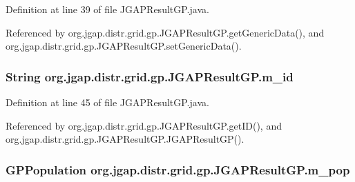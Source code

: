 Definition at line 39 of file J\-G\-A\-P\-Result\-G\-P.\-java.



Referenced by org.\-jgap.\-distr.\-grid.\-gp.\-J\-G\-A\-P\-Result\-G\-P.\-get\-Generic\-Data(), and org.\-jgap.\-distr.\-grid.\-gp.\-J\-G\-A\-P\-Result\-G\-P.\-set\-Generic\-Data().

\hypertarget{classorg_1_1jgap_1_1distr_1_1grid_1_1gp_1_1_j_g_a_p_result_g_p_ac524027057f8527767293b850f8b6e8d}{
\subsubsection[{m\-\_\-id}]{\setlength{\rightskip}{0pt plus 5cm}String org.\-jgap.\-distr.\-grid.\-gp.\-J\-G\-A\-P\-Result\-G\-P.\-m\-\_\-id\hspace{0.3cm}{\ttfamily [private]}}}\label{classorg_1_1jgap_1_1distr_1_1grid_1_1gp_1_1_j_g_a_p_result_g_p_ac524027057f8527767293b850f8b6e8d}


Definition at line 45 of file J\-G\-A\-P\-Result\-G\-P.\-java.



Referenced by org.\-jgap.\-distr.\-grid.\-gp.\-J\-G\-A\-P\-Result\-G\-P.\-get\-I\-D(), and org.\-jgap.\-distr.\-grid.\-gp.\-J\-G\-A\-P\-Result\-G\-P.\-J\-G\-A\-P\-Result\-G\-P().

\hypertarget{classorg_1_1jgap_1_1distr_1_1grid_1_1gp_1_1_j_g_a_p_result_g_p_a502d518ac6ca27f3b3c9dfc74b9181bb}{
\subsubsection[{m\-\_\-pop}]{\setlength{\rightskip}{0pt plus 5cm}G\-P\-Population org.\-jgap.\-distr.\-grid.\-gp.\-J\-G\-A\-P\-Result\-G\-P.\-m\-\_\-pop\hspace{0.3cm}{\ttfamily [private]}}}\label{classorg_1_1jgap_1_1distr_1_1grid_1_1gp_1_1_j_g_a_p_result_g_p_a502d518ac6ca27f3b3c9dfc74b9181bb}


